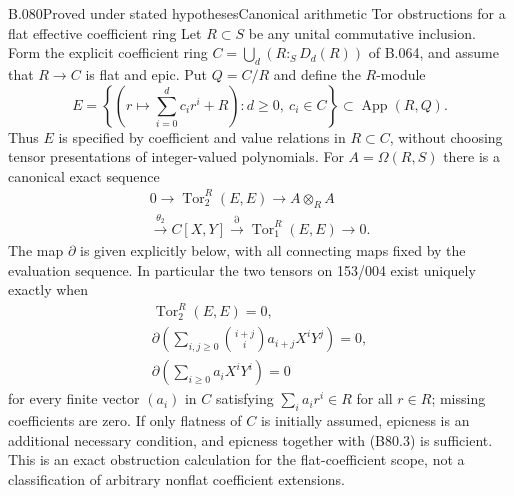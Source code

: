 \begin{saresult}{B.080}{Proved under stated hypotheses}{Canonical arithmetic Tor obstructions for a flat effective coefficient ring}
Let $R\subset S$ be any unital commutative inclusion. Form the explicit
coefficient ring $C=\bigcup_d(R:_S D_d(R))$ of B.064, and assume that
$R\to C$ is flat and epic. Put $Q=C/R$ and define the $R$-module
\[
 E=\left\{\left(r\longmapsto\sum_{i=0}^d c_i r^i+R\right):
                       d\ge0,\ c_i\in C\right\}
       \subset\operatorname{App}(R,Q).                   \tag{B80.1}
\]
Thus $E$ is specified by coefficient and value relations in $R\subset C$,
without choosing tensor presentations of integer-valued polynomials.
For $A=\Omega(R,S)$ there is a canonical exact sequence
\[
\begin{gathered}
 0\longrightarrow\operatorname{Tor}_2^R(E,E)
 \longrightarrow A\otimes_R A\\
 \xrightarrow{\theta_2} C[X,Y]
 \xrightarrow{\partial}\operatorname{Tor}_1^R(E,E)
 \longrightarrow0.
\end{gathered}                                          \tag{B80.2}
\]
The map $\partial$ is given explicitly below, with all connecting maps
fixed by the evaluation sequence. In particular the two tensors on
153/004 exist uniquely exactly when
\[
\begin{gathered}
 \operatorname{Tor}_2^R(E,E)=0,\\
 \partial\!\left(\sum_{i,j\ge0}\binom{i+j}{i}
                         a_{i+j}X^iY^j\right)=0,\\
 \partial\!\left(\sum_{i\ge0}a_iX^iY^i\right)=0
                                                        \tag{B80.3}
\end{gathered}
\]
for every finite vector $(a_i)$ in $C$ satisfying
$\sum_i a_i r^i\in R$ for all $r\in R$; missing coefficients are zero.
If only flatness of $C$ is initially assumed, epicness is an additional
necessary condition, and epicness together with (B80.3) is sufficient.
This is an exact obstruction calculation for the flat-coefficient
scope, not a classification of arbitrary nonflat coefficient extensions.
\end{saresult}
